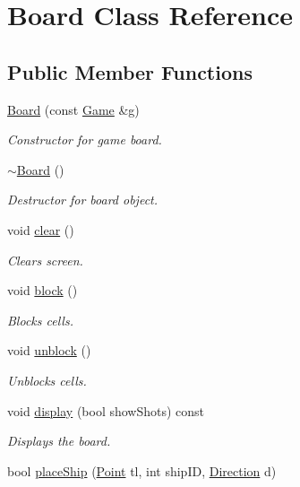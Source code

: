 \hypertarget{class_board}{}\section{Board Class Reference}
\label{class_board}
\subsection*{Public Member Functions}
\begin{DoxyCompactItemize}
\item 
\mbox{\hyperlink{class_board_aa08d83943c9f7c727a96175feb05f1f8}{Board}} (const \mbox{\hyperlink{class_game}{Game}} \&g)
\begin{DoxyCompactList}\small\item\em Constructor for game board. \end{DoxyCompactList}\item 
\mbox{\hyperlink{class_board_af73f45730119a1fd8f6670f53f959e68}{$\sim$\+Board}} ()
\begin{DoxyCompactList}\small\item\em Destructor for board object. \end{DoxyCompactList}\item 
void \mbox{\hyperlink{class_board_af74f0d4b43e5aa3faea16d7c6407b05e}{clear}} ()
\begin{DoxyCompactList}\small\item\em Clears screen. \end{DoxyCompactList}\item 
void \mbox{\hyperlink{class_board_aaf09ad3613729ef00351f2c309e9b6cc}{block}} ()
\begin{DoxyCompactList}\small\item\em Blocks cells. \end{DoxyCompactList}\item 
void \mbox{\hyperlink{class_board_afb89d8a0417a53952ee2b64437282253}{unblock}} ()
\begin{DoxyCompactList}\small\item\em Unblocks cells. \end{DoxyCompactList}\item 
void \mbox{\hyperlink{class_board_a47f5e3908bd99b9cf1a9ed2050b7cfd9}{display}} (bool show\+Shots) const
\begin{DoxyCompactList}\small\item\em Displays the board. \end{DoxyCompactList}\item 
bool \mbox{\hyperlink{class_board_a47be427a7c565e29dd2606c95972bf91}{place\+Ship}} (\mbox{\hyperlink{class_point}{Point}} tl, int ship\+ID, \mbox{\hyperlink{_globals_8h_a224b9163917ac32fc95a60d8c1eec3aa}{Direction}} d)

\end{DoxyCompactItemize}
